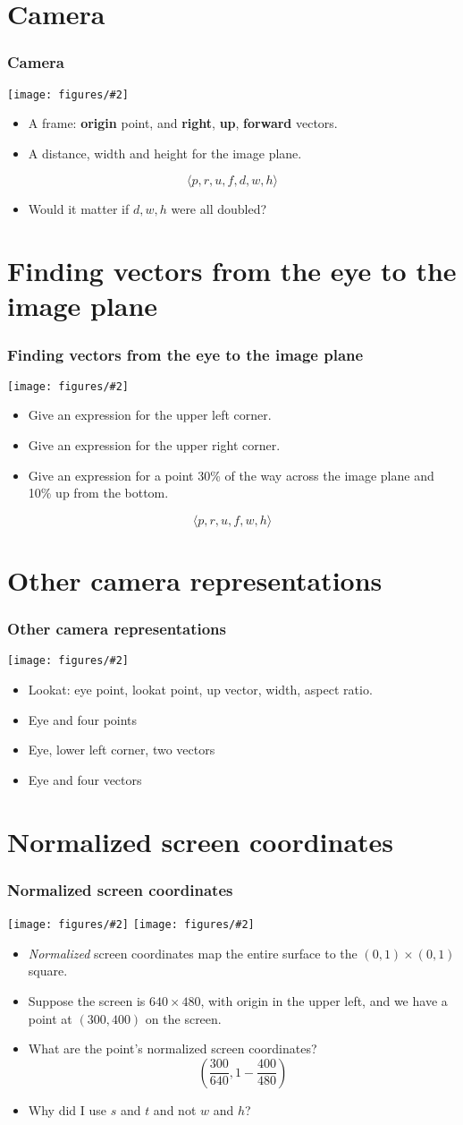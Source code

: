 \documentclass[slidestop,xcolor=pst]{beamer}
\newcommand{\mygraph}[2]{\texttt{[image: figures/\#2]}}
\newcommand{\sect}[1]{
\section{#1}
\begin{frame}[fragile]\frametitle{#1}
}
\begin{document}
\sect{Camera}
\mygraph{.5}{camera01.png}
\begin{minipage}[b]{2.25in}
\begin{itemize}
\item A frame: {\bf origin} point, and {\bf right}, {\bf up}, {\bf forward} vectors.
\item A distance, width and height for the image plane.
\end{itemize}
\[ \langle p,r,u,f,d,w,h \rangle \]
\begin{itemize}
\item Would it matter if $d,w,h$ were all doubled?
\end{itemize}
\end{minipage}
\end{frame}

\sect{Finding vectors from the eye to the image plane}
\mygraph{.5}{mapping02.png}
\begin{minipage}[b]{2.25in}
\begin{itemize}
\item Give an expression for the upper left corner.
  \item Give an expression for the upper right corner.
\item Give an expression for a point 30\% of the way across the image
  plane and 10\% up from the bottom.
\end{itemize}
\end{minipage}

\[ \langle p,r,u,f,w,h \rangle \]
\end{frame}


\sect{Other camera representations}
\mygraph{.5}{camera01.png}
\begin{minipage}[b]{2.25in}
\begin{itemize}
\item Lookat:  eye point, lookat point, up vector, width, aspect ratio.
\item Eye and four points
\item Eye, lower left corner, two vectors
\item Eye and four vectors
\end{itemize}
\end{minipage}
\end{frame}


\sect{Normalized screen coordinates}
\mygraph{.35}{mapping01.png}\hfill
\mygraph{.35}{normalsquare.png}
\begin{itemize}
\item {\em Normalized} screen coordinates map the entire surface to
  the $(0,1)\times(0,1)$ square.
\item Suppose the screen is $640\times480$, with origin in the upper
  left, and we have a point at $(300,400)$ on the screen.
\item What are the point's normalized screen coordinates? \pause
  \[
  \left(\frac{300}{640}, 1-\frac{400}{480}\right)
  \]
  \pause
  \item Why did I use $s$ and $t$ and not $w$ and $h$?
\end{itemize}
\end{frame}
\end{document}
